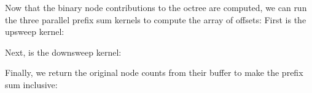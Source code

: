\documentclass{thesis}
\begin{document}
Now that the binary node contributions to the octree are computed, we can run the three parallel prefix sum kernels to compute the array of offsets:
First is the upsweep kernel:
\begin{algorithmic}
    \For{}
    \EndFor
\end{algorithmic}

Next, is the downsweep kernel:
\begin{algorithmic}
    \For{}
    \EndFor
\end{algorithmic}

Finally, we return the original node counts from their buffer to make the prefix sum inclusive:
\begin{algorithmic}
    \For{}
    \EndFor
\end{algorithmic}
\end{document}

